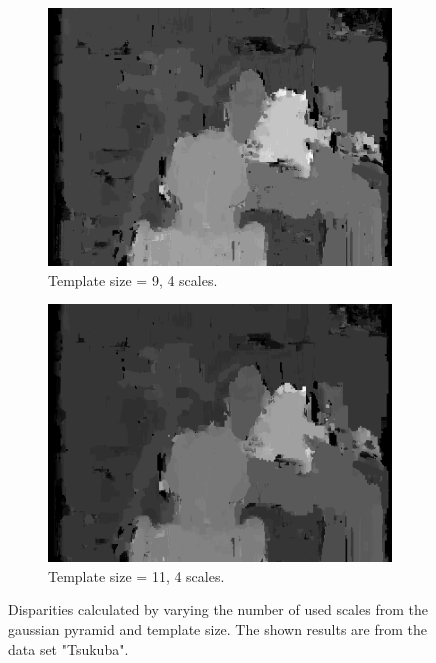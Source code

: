 \documentclass[12pt,a4paper,oneside,final]{article}
\begin{document}
\begin{figure}[H]
\begin{subfigure}[b]{0.24\textwidth}
	\includegraphics[width=\textwidth]{disparity_s4_k9set_1.png}
	\caption{Template size = 9, 4 scales.}
\end{subfigure}
\begin{subfigure}[b]{0.24\textwidth}
	\includegraphics[width=\textwidth]{disparity_s4_k11set_1.png}
	\caption{Template size = 11, 4 scales.}
\end{subfigure}
\caption{Disparities calculated by varying the number of used scales from the gaussian pyramid and template size. The shown results are from the data set "Tsukuba".}
\label{fig:disparities}
\end{figure}
\end{document}
